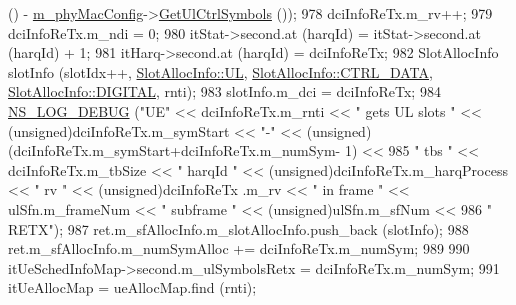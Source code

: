 \begin{DoxyCode}
       () - \hyperlink{classns3_1_1MmWaveMacScheduler_a24d7af4971d2e500fe543cefbafa2fd9}{m\_phyMacConfig}->\hyperlink{classns3_1_1MmWavePhyMacCommon_aa0bf8af14050bc5dc6513fbc86319a9b}{GetUlCtrlSymbols} ());
978                                         dciInfoReTx.m\_rv++;
979                                         dciInfoReTx.m\_ndi = 0;
980                                         itStat->second.at (harqId) = itStat->second.at (harqId) + 1;
981                                         itHarq->second.at (harqId) = dciInfoReTx;
982                                         SlotAllocInfo slotInfo (slotIdx++, 
      \hyperlink{structns3_1_1SlotAllocInfo_a6cad60db1d39034f1851e2cea625fe5da916b5be54594ead6ed677c570311cad2}{SlotAllocInfo::UL}, \hyperlink{structns3_1_1SlotAllocInfo_a3ea7cb503bfd0c9a4df55a71b81b9331a1ea636c3f068558fabacbc39934309b8}{SlotAllocInfo::CTRL\_DATA}, 
      \hyperlink{structns3_1_1SlotAllocInfo_adcbd067d82be6260b3399167d8f0b4eca47a67c342db658a08ded9ce4b49417ea}{SlotAllocInfo::DIGITAL}, rnti);
983                                         slotInfo.m\_dci = dciInfoReTx;
984                                         \hyperlink{group__logging_ga413f1886406d49f59a6a0a89b77b4d0a}{NS\_LOG\_DEBUG} (\textcolor{stringliteral}{"UE"} << dciInfoReTx.m\_rnti << \textcolor{stringliteral}{" gets UL
       slots "} << (\textcolor{keywordtype}{unsigned})dciInfoReTx.m\_symStart << \textcolor{stringliteral}{"-"} << (\textcolor{keywordtype}{unsigned})(dciInfoReTx.m\_symStart+dciInfoReTx.m\_numSym-
      1) <<
985                                                                                                 \textcolor{stringliteral}{" tbs "} << 
      dciInfoReTx.m\_tbSize << \textcolor{stringliteral}{" harqId "} << (\textcolor{keywordtype}{unsigned})dciInfoReTx.m\_harqProcess << \textcolor{stringliteral}{" rv "} << (\textcolor{keywordtype}{unsigned})dciInfoReTx
      .m\_rv << \textcolor{stringliteral}{" in frame "} << ulSfn.m\_frameNum << \textcolor{stringliteral}{" subframe "} << (\textcolor{keywordtype}{unsigned})ulSfn.m\_sfNum <<
986                                                                                                 \textcolor{stringliteral}{" RETX"});
987                                         ret.m\_sfAllocInfo.m\_slotAllocInfo.push\_back (slotInfo);
988                                         ret.m\_sfAllocInfo.m\_numSymAlloc += dciInfoReTx.m\_numSym;
989 
990                                         itUeSchedInfoMap->second.m\_ulSymbolsRetx = dciInfoReTx.m\_numSym;
991                                         itUeAllocMap = ueAllocMap.find (rnti);

\end{DoxyCode}
